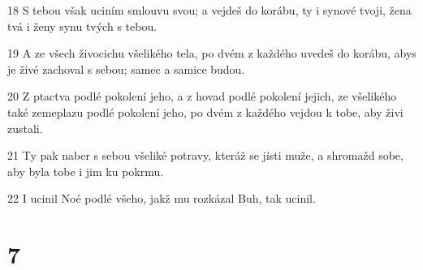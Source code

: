 \par 18 S tebou však uciním smlouvu svou; a vejdeš do korábu, ty i synové tvoji, žena tvá i ženy synu tvých s tebou.
\par 19 A ze všech živocichu všelikého tela, po dvém z každého uvedeš do korábu, abys je živé zachoval s sebou; samec a samice budou.
\par 20 Z ptactva podlé pokolení jeho, a z hovad podlé pokolení jejich, ze všelikého také zemeplazu podlé pokolení jeho, po dvém z každého vejdou k tobe, aby živi zustali.
\par 21 Ty pak naber s sebou všeliké potravy, kteráž se jísti muže, a shromažd sobe, aby byla tobe i jim ku pokrmu.
\par 22 I ucinil Noé podlé všeho, jakž mu rozkázal Buh, tak ucinil.

\chapter{7}

